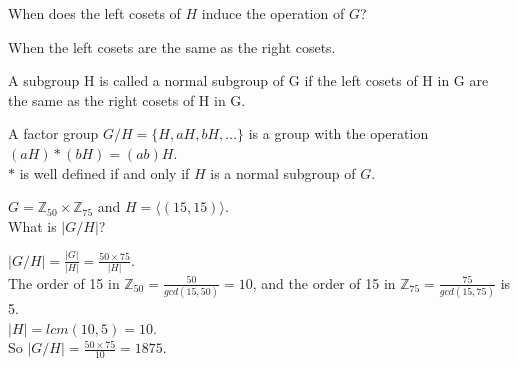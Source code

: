 \begin{eg} 
    When does the left cosets of $H$ induce the operation of $G$?\\
\end{eg}
\begin{answer}
    When the left cosets are the same as the right cosets.\\
\end{answer}

\begin{definition}
    A subgroup H is called a normal subgroup of G if the left cosets of H in G are the same as the right cosets of H in G.\\
\end{definition}

\begin{theorem}
    A factor group $G/H = \{H, aH, bH, \dots\}$ is a group with the operation $(aH)\ast(bH) = (ab)H$.\\ $\ast$ is well defined if and only if $H$ is a normal subgroup of $G$.\\
\end{theorem}

\begin{eg}
    $G = \mathbb{Z}_{50} \times \mathbb{Z}_{75}$ and $H = \langle (15, 15) \rangle$.\\ What is $|G/H|$?\\
\end{eg}
\begin{answer}
    $|G/H| = \frac{|G|}{|H|} = \frac{50 \times 75}{|H|}.$\\ 
    The order of 15 in $\mathbb{Z}_{50} = \frac{50}{gcd(15, 50)} = 10$, and the order of 15 in $\mathbb{Z}_{75} = \frac{75}{gcd(15, 75)}$ is 5.\\
    $|H| = lcm(10, 5) = 10$.\\ 
    So $|G/H| = \frac{50 \times 75}{10} = 1875$.\\
\end{answer}
